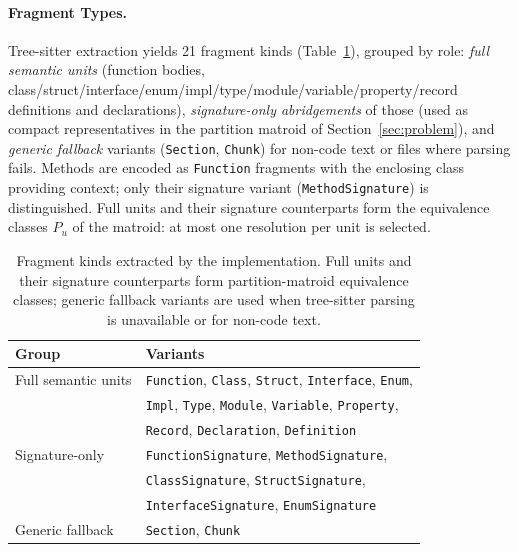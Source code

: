 \documentclass[11pt, a4paper]{article}
\begin{document}
\paragraph{Fragment Types.} Tree-sitter extraction yields 21 fragment kinds (Table~\ref{tab:fragment-types}), grouped by role: \emph{full semantic units} (function bodies, class/struct/interface/enum/impl/type/module/variable/property/record definitions and declarations), \emph{signature-only abridgements} of those (used as compact representatives in the partition matroid of Section~\ref{sec:problem}), and \emph{generic fallback} variants (\texttt{Section}, \texttt{Chunk}) for non-code text or files where parsing fails. Methods are encoded as \texttt{Function} fragments with the enclosing class providing context; only their signature variant (\texttt{MethodSignature}) is distinguished. Full units and their signature counterparts form the equivalence classes $P_u$ of the matroid: at most one resolution per unit is selected.

\begin{table}[h]
\centering
\small
\begin{tabular}{ll}
\toprule
\textbf{Group} & \textbf{Variants} \\
\midrule
Full semantic units & \texttt{Function}, \texttt{Class}, \texttt{Struct}, \texttt{Interface}, \texttt{Enum}, \\
                    & \texttt{Impl}, \texttt{Type}, \texttt{Module}, \texttt{Variable}, \texttt{Property}, \\
                    & \texttt{Record}, \texttt{Declaration}, \texttt{Definition} \\
Signature-only      & \texttt{FunctionSignature}, \texttt{MethodSignature}, \\
                    & \texttt{ClassSignature}, \texttt{StructSignature}, \\
                    & \texttt{InterfaceSignature}, \texttt{EnumSignature} \\
Generic fallback    & \texttt{Section}, \texttt{Chunk} \\
\bottomrule
\end{tabular}
\caption{Fragment kinds extracted by the implementation. Full units and their signature counterparts form partition-matroid equivalence classes; generic fallback variants are used when tree-sitter parsing is unavailable or for non-code text.}
\label{tab:fragment-types}
\end{table}
\end{document}

